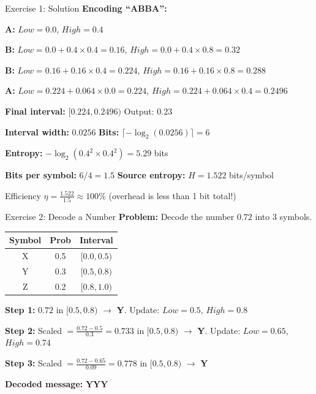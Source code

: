 \documentclass[aspectratio=169,12pt]{beamer}
\begin{document}
\begin{frame}{Exercise 1: Solution}
    \textbf{Encoding ``ABBA'':}
    
    \textbf{A:} $Low = 0.0$, $High = 0.4$
    
    \textbf{B:} $Low = 0.0 + 0.4 \times 0.4 = 0.16$, $High = 0.0 + 0.4 \times 0.8 = 0.32$
    
    \textbf{B:} $Low = 0.16 + 0.16 \times 0.4 = 0.224$, $High = 0.16 + 0.16 \times 0.8 = 0.288$
    
    \textbf{A:} $Low = 0.224 + 0.064 \times 0.0 = 0.224$, $High = 0.224 + 0.064 \times 0.4 = 0.2496$
    
    \vspace{0.3cm}
    \textbf{Final interval:} $\boxed{[0.224, 0.2496)}$ \quad Output: $\mathbf{0.23}$
    
    \vspace{0.3cm}
    \textbf{Interval width:} $0.0256$ \quad \textbf{Bits:} $\lceil -\log_2(0.0256) \rceil = 6$
    
    \textbf{Entropy:} $-\log_2(0.4^2 \times 0.4^2) = 5.29$ bits
    
    \textbf{Bits per symbol:} $6/4 = 1.5$ \quad \textbf{Source entropy:} $H = 1.522$ bits/symbol
    
    \begin{block}{Efficiency}
        $\eta = \frac{1.522}{1.5} \approx 100\%$ (overhead is less than 1 bit total!)
    \end{block}
\end{frame}

\begin{frame}{Exercise 2: Decode a Number}
    \textbf{Problem:} Decode the number $0.72$ into 3 symbols.
    
    \begin{center}
        \begin{tabular}{c|c|c}
            \toprule
            Symbol & Prob & Interval \\
            \midrule
            X & 0.5 & $[0.0, 0.5)$ \\
            Y & 0.3 & $[0.5, 0.8)$ \\
            Z & 0.2 & $[0.8, 1.0)$ \\
            \bottomrule
        \end{tabular}
    \end{center}
    
    \textbf{Step 1:} $0.72$ in $[0.5, 0.8)$ $\rightarrow$ \textbf{Y}. Update: $Low=0.5$, $High=0.8$
    
    \textbf{Step 2:} Scaled $= \frac{0.72-0.5}{0.3} = 0.733$ in $[0.5, 0.8)$ $\rightarrow$ \textbf{Y}. Update: $Low=0.65$, $High=0.74$
    
    \textbf{Step 3:} Scaled $= \frac{0.72-0.65}{0.09} = 0.778$ in $[0.5, 0.8)$ $\rightarrow$ \textbf{Y}
    
    \vspace{0.3cm}
    \textbf{Decoded message:} $\boxed{\textbf{YYY}}$
\end{frame}
\end{document}
